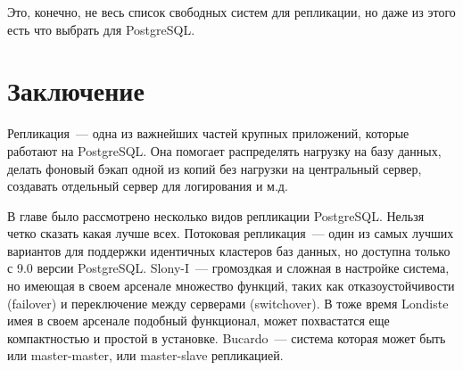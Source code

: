 Это, конечно, не весь список свободных систем для репликации, но даже из этого есть что выбрать для PostgreSQL.










\section{Заключение}

Репликация~--- одна из важнейших частей крупных приложений, которые работают на PostgreSQL. Она помогает распределять нагрузку на базу данных, делать фоновый бэкап одной из копий без нагрузки на центральный сервер, создавать отдельный сервер для логирования и м.д.

В главе было рассмотрено несколько видов репликации PostgreSQL. Нельзя четко сказать какая лучше всех. Потоковая репликация~--- один из самых лучших вариантов для поддержки идентичных кластеров баз данных, но доступна только с 9.0 версии PostgreSQL. Slony-I~--- громоздкая и сложная в настройке система, но имеющая в своем арсенале множество функций, таких как отказоустойчивости (failover) и переключение между серверами (switchover). В тоже время Londiste имея в своем арсенале подобный функционал, может похвастатся еще компактностью и простой в установке. Bucardo~--- система которая может быть или master-master, или master-slave репликацией.